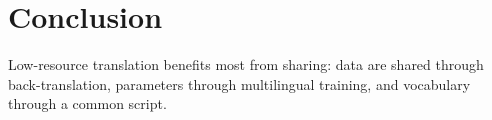 \chapter{Conclusion}
\label{ch:conclusion}

Low-resource translation benefits most from sharing: data are shared through
back-translation, parameters through multilingual training, and vocabulary through a common
script.
